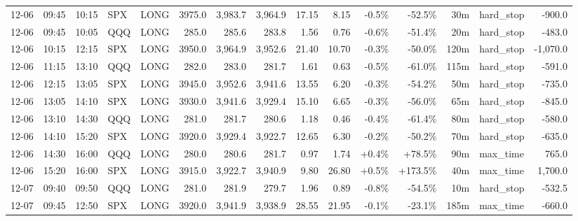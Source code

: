 \documentclass[11pt,a4paper,twoside]{article}
\begin{document}
\begin{landscape}
\begin{center}
\begin{longtable}{>{\color{txtmain}}l l l l l r r r r r r r r >{\color{txtmain}}l r}
12-06 & 09:45 & 10:15 & SPX & LONG & 3975.0 & 3,983.7 & 3,964.9 & 17.15 & 8.15 & \textcolor{lossred}{-0.5\%} & \textcolor{lossred}{-52.5\%} & 30m & hard\_stop & \textcolor{lossred}{-900.0} \\
12-06 & 09:45 & 10:05 & QQQ & LONG & 285.0 & 285.6 & 283.8 & 1.56 & 0.76 & \textcolor{lossred}{-0.6\%} & \textcolor{lossred}{-51.4\%} & 20m & hard\_stop & \textcolor{lossred}{-483.0} \\
12-06 & 10:15 & 12:15 & SPX & LONG & 3950.0 & 3,964.9 & 3,952.6 & 21.40 & 10.70 & \textcolor{lossred}{-0.3\%} & \textcolor{lossred}{-50.0\%} & 120m & hard\_stop & \textcolor{lossred}{-1,070.0} \\
12-06 & 11:15 & 13:10 & QQQ & LONG & 282.0 & 283.0 & 281.7 & 1.61 & 0.63 & \textcolor{lossred}{-0.5\%} & \textcolor{lossred}{-61.0\%} & 115m & hard\_stop & \textcolor{lossred}{-591.0} \\
12-06 & 12:15 & 13:05 & SPX & LONG & 3945.0 & 3,952.6 & 3,941.6 & 13.55 & 6.20 & \textcolor{lossred}{-0.3\%} & \textcolor{lossred}{-54.2\%} & 50m & hard\_stop & \textcolor{lossred}{-735.0} \\
12-06 & 13:05 & 14:10 & SPX & LONG & 3930.0 & 3,941.6 & 3,929.4 & 15.10 & 6.65 & \textcolor{lossred}{-0.3\%} & \textcolor{lossred}{-56.0\%} & 65m & hard\_stop & \textcolor{lossred}{-845.0} \\
12-06 & 13:10 & 14:30 & QQQ & LONG & 281.0 & 281.7 & 280.6 & 1.18 & 0.46 & \textcolor{lossred}{-0.4\%} & \textcolor{lossred}{-61.4\%} & 80m & hard\_stop & \textcolor{lossred}{-580.0} \\
12-06 & 14:10 & 15:20 & SPX & LONG & 3920.0 & 3,929.4 & 3,922.7 & 12.65 & 6.30 & \textcolor{lossred}{-0.2\%} & \textcolor{lossred}{-50.2\%} & 70m & hard\_stop & \textcolor{lossred}{-635.0} \\
12-06 & 14:30 & 16:00 & QQQ & LONG & 280.0 & 280.6 & 281.7 & 0.97 & 1.74 & \textcolor{wingreen}{+0.4\%} & \textcolor{wingreen}{+78.5\%} & 90m & max\_time & \textcolor{wingreen}{765.0} \\
12-06 & 15:20 & 16:00 & SPX & LONG & 3915.0 & 3,922.7 & 3,940.9 & 9.80 & 26.80 & \textcolor{wingreen}{+0.5\%} & \textcolor{wingreen}{+173.5\%} & 40m & max\_time & \textcolor{wingreen}{1,700.0} \\
12-07 & 09:40 & 09:50 & QQQ & LONG & 281.0 & 281.9 & 279.7 & 1.96 & 0.89 & \textcolor{lossred}{-0.8\%} & \textcolor{lossred}{-54.5\%} & 10m & hard\_stop & \textcolor{lossred}{-532.5} \\
12-07 & 09:45 & 12:50 & SPX & LONG & 3920.0 & 3,941.9 & 3,938.9 & 28.55 & 21.95 & \textcolor{lossred}{-0.1\%} & \textcolor{lossred}{-23.1\%} & 185m & max\_time & \textcolor{lossred}{-660.0} \\

\end{longtable}
\end{center}
\end{landscape}
\end{document}
